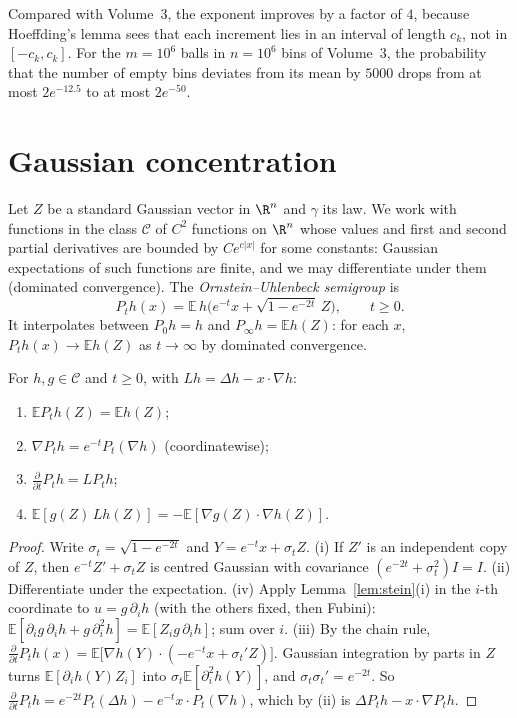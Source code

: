 Compared with Volume~3, the exponent improves by a factor of $4$, because Hoeffding's lemma sees that each increment lies in an interval of length $c_k$, not in
$[-c_k,c_k]$. For the $m=10^6$ balls in $n=10^6$ bins of Volume~3, the probability that the number of empty bins deviates from its mean by $5000$ drops from at most
$2e^{-12.5}$ to at most $2e^{-50}$.

\section{Gaussian concentration}

Let $Z$ be a standard Gaussian vector in $\R^n$ and $\gamma$ its law. We work with functions in the class $\mathcal C$ of $C^2$ functions on $\R^n$ whose values and first and
second partial derivatives are bounded by $Ce^{c|x|}$ for some constants: Gaussian expectations of such functions are finite, and we may differentiate under them
(dominated convergence). The \emph{Ornstein--Uhlenbeck semigroup} is
\[
P_th(x)=\mathbb E\,h\bigl(e^{-t}x+\sqrt{1-e^{-2t}}\,Z\bigr),\qquad t\ge0.
\]
It interpolates between $P_0h=h$ and $P_\infty h=\mathbb Eh(Z)$: for each $x$, $P_th(x)\to\mathbb Eh(Z)$ as $t\to\infty$ by dominated convergence.

\begin{lemma}\label{lem:ou}
For $h,g\in\mathcal C$ and $t\ge0$, with $Lh=\Delta h-x\cdot\nabla h$:
\begin{enumerate}[label=(\roman*)]
\item $\mathbb EP_th(Z)=\mathbb Eh(Z)$;
\item $\nabla P_th=e^{-t}P_t(\nabla h)$ (coordinatewise);
\item $\frac{\partial}{\partial t}P_th=LP_th$;
\item $\mathbb E[g(Z)\,Lh(Z)]=-\mathbb E[\nabla g(Z)\cdot\nabla h(Z)]$.
\end{enumerate}
\end{lemma}
\begin{proof}
Write $\sigma_t=\sqrt{1-e^{-2t}}$ and $Y=e^{-t}x+\sigma_tZ$. (i) If $Z'$ is an independent copy of $Z$, then $e^{-t}Z'+\sigma_tZ$ is centred Gaussian with covariance $(e^{-2t}+\sigma_t^2)I=I$.
(ii) Differentiate under the expectation. (iv) Apply Lemma~\ref{lem:stein}(i) in the $i$-th coordinate to $u=g\,\partial_ih$ (with the others fixed, then Fubini):
$\mathbb E[\partial_ig\,\partial_ih+g\,\partial_i^2h]=\mathbb E[Z_ig\,\partial_ih]$; sum over $i$. (iii) By the chain rule, $\frac{\partial}{\partial t}P_th(x)=\mathbb E\bigl[\nabla h(Y)\cdot(-e^{-t}x+\sigma_t'Z)\bigr]$.
Gaussian integration by parts in $Z$ turns $\mathbb E[\partial_ih(Y)Z_i]$ into $\sigma_t\mathbb E[\partial_i^2h(Y)]$, and $\sigma_t\sigma_t'=e^{-2t}$. So
$\frac{\partial}{\partial t}P_th=e^{-2t}P_t(\Delta h)-e^{-t}x\cdot P_t(\nabla h)$, which by (ii) is $\Delta P_th-x\cdot\nabla P_th$.
\end{proof}

